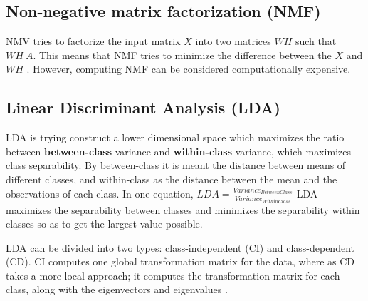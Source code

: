 \subsection{Non-negative matrix factorization (NMF)}\label{subsection:NMF}
NMV tries to factorize the input matrix $X$ into two matrices $WH$ such that $WH ~ A$. This means that NMF tries to minimize the difference between the $X$ and $WH$ \cite{non-negative-matrix-factorization}. However, computing NMF can be considered computationally expensive.

\begin{comment}
  @misc{non-negative-matrix-factorization,
        organization = {Department of Mathematics and Operational Research Faculte Polytechnique, Universite de Mons},
        url          = {https://arxiv.org/pdf/1401.5226.pdf},
        author       = {Nicolas Gillis}
        title        = {The Why and How of Nonnegative Matrix Factorization},
        urldate      = {2022-10-11}
      }
  \end{comment}
  


\subsection{Linear Discriminant Analysis (LDA)}\label{subsection:LDA}
LDA is trying construct a lower dimensional space which maximizes the ratio between \textbf{between-class} variance and \textbf{within-class} variance, which maximizes class separability. By between-class it is meant the distance between means of different classes, and within-class as the distance between the mean and the observations of each class. In one equation, $LDA = \frac{Variance_{BetweenClass}}{Variance_{WithinClass}}$ LDA maximizes the separability between classes and minimizes the separability within classes so as to get the largest value possible.

\begin{comment}
@misc{linear-discriminant-analysis-tutorial,
      organization = {University of Salford Manchester},
      url          = {http://usir.salford.ac.uk/id/eprint/52074/1/AI\_Com\_LDA\_Tarek.pdf},
      title        = {Linear discriminant analysis: a detailed tutorial},
      urldate      = {2022-10-11}
    }
    \end{comment} 
    
LDA can be divided into two types: class-independent (CI) and class-dependent (CD). CI computes one global transformation matrix for the data, where as CD takes a more local approach; it computes the transformation matrix for each class, along with the eigenvectors and eigenvalues \cite{linear-discriminant-analysis-tutorial}.

